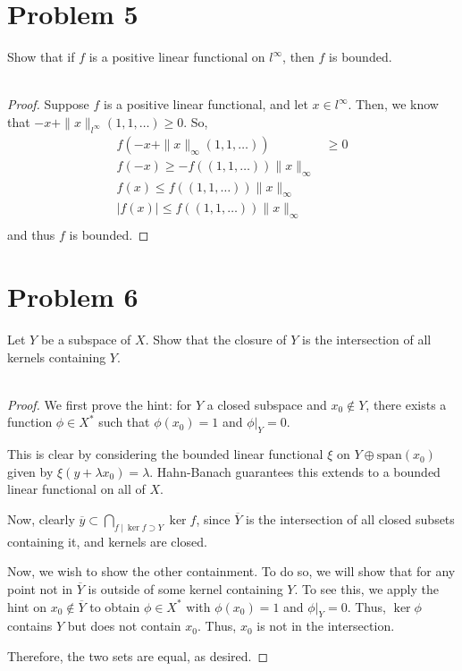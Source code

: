 \documentclass[fontsize=11pt]{scrartcl} %
\numberwithin{equation}{section} %
\numberwithin{figure}{section} %
\numberwithin{table}{section} %
\begin{document}
\section*{Problem 5}
Show that if $f$ is a positive linear functional on $l^{\infty}$, then $f$ is
bounded.
\\
\\
\begin{proof}
    Suppose $f$ is a positive linear functional, and let $x\in l^{\infty}$.
    Then, we know that $-x + \|x\|_{l^{\infty}}(1,1,\ldots) \geq 0$. So,
    \[
        \begin{aligned}
            f(-x + \|x\|_{\infty}(1,1,\ldots)) &\geq 0\\
            f(-x)\geq -f((1,1,\ldots))\|x\|_{\infty}\\
            f(x) \leq f((1,1,\ldots))\|x\|_{\infty}\\
            |f(x)| \leq f((1,1,\ldots))\|x\|_{\infty}\\
        \end{aligned}
    \]
    and thus $f$ is bounded.
\end{proof}

\section*{Problem 6}
Let $Y$ be a subspace of $X$. Show that the closure of $Y$ is the intersection
of all kernels containing $Y$.
\\
\\
\begin{proof}
    We first prove the hint: for $Y$ a closed subspace and $x_0\not\in Y$, there
    exists a function $\phi\in X^*$ such that $\phi(x_0) = 1$ and $\phi|_Y=0$.

    This is clear by considering the bounded linear functional $\xi$ on
    $Y\oplus\text{span}(x_0)$ given by $\xi(y+\lambda x_0) = \lambda$.
    Hahn-Banach guarantees this extends to a bounded linear functional on all of
    $X$.

    Now, clearly $\overline{y}\subset \bigcap_{f\ |\ \ker f\supset Y}\ker f$,
    since $\overline{Y}$ is the intersection of all closed subsets containing
    it, and kernels are closed.

    Now, we wish to show the other containment. To do so, we will show that for
    any point not in $\overline{Y}$ is outside of some kernel containing $Y$. To
    see this, we apply the hint on $x_0\not\in \overline{Y}$ to obtain $\phi\in X^*$ with
    $\phi(x_0)=1$ and $\phi|_Y=0$. Thus, $\ker\phi$ contains $Y$ but does not
    contain $x_0$. Thus, $x_0$ is not in the intersection.

    Therefore, the two sets are equal, as desired.
\end{proof}
\end{document}
